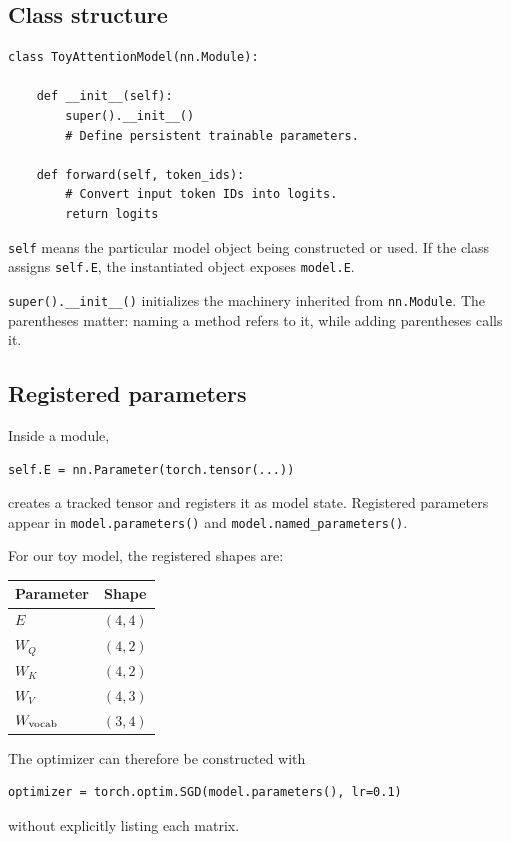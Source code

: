 \documentclass[11pt]{article}
\begin{document}
\subsection{Class structure}

\begin{lstlisting}
class ToyAttentionModel(nn.Module):

    def __init__(self):
        super().__init__()
        # Define persistent trainable parameters.

    def forward(self, token_ids):
        # Convert input token IDs into logits.
        return logits
\end{lstlisting}

\texttt{self} means the particular model object being constructed or used. If the class assigns
\texttt{self.E}, the instantiated object exposes \texttt{model.E}.

\texttt{super().\_\_init\_\_()} initializes the machinery inherited from \texttt{nn.Module}. The parentheses
matter: naming a method refers to it, while adding parentheses calls it.

\subsection{Registered parameters}

Inside a module,
\begin{lstlisting}
self.E = nn.Parameter(torch.tensor(...))
\end{lstlisting}
creates a tracked tensor and registers it as model state. Registered parameters appear in
\texttt{model.parameters()} and \texttt{model.named\_parameters()}.

For our toy model, the registered shapes are:
\begin{center}
\begin{tabular}{lc}
\toprule
Parameter & Shape\\
\midrule
$E$ & $(4,4)$\\
$W_Q$ & $(4,2)$\\
$W_K$ & $(4,2)$\\
$W_V$ & $(4,3)$\\
$W_{\rm vocab}$ & $(3,4)$\\
\bottomrule
\end{tabular}
\end{center}

The optimizer can therefore be constructed with
\begin{lstlisting}
optimizer = torch.optim.SGD(model.parameters(), lr=0.1)
\end{lstlisting}
without explicitly listing each matrix.
\end{document}
